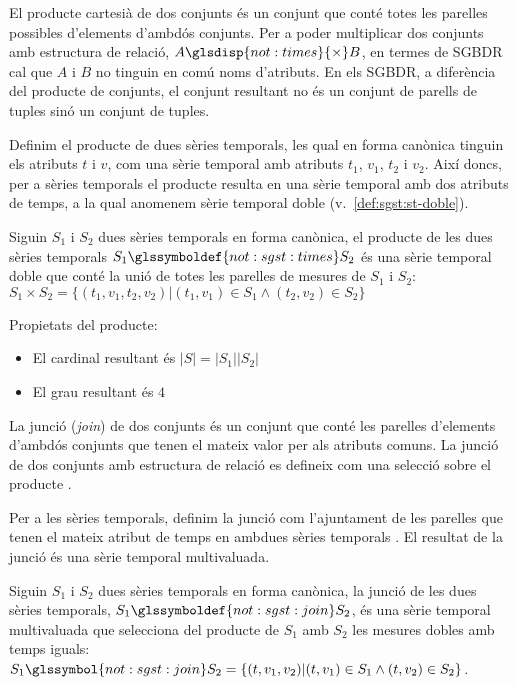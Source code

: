 El producte cartesià de dos conjunts és un conjunt que conté totes les
parelles possibles d'elements d'ambdós conjunts.  Per a poder
multiplicar dos conjunts amb estructura de relació, $A
\glsdisp{not:times}{\times} B$, en termes de \gls{SGBDR} cal que $A$ i
$B$ no tinguin en comú noms d'atributs.  En els \gls{SGBDR}, a
diferència del producte de conjunts, el conjunt resultant no és un
conjunt de parells de tuples sinó un conjunt de tuples.

Definim el producte de dues sèries temporals, les qual en
forma canònica tinguin els atributs $t$ i $v$, com una sèrie temporal
amb atributs $t_1$, $v_1$, $t_2$ i $v_2$. Així doncs, per a sèries
temporals el producte resulta en una sèrie temporal amb dos atributs
de temps, a la qual anomenem sèrie temporal doble (v.\
\autoref{def:sgst:st-doble}).
\begin{definition}[Producte]
  Siguin $S_1$ i $S_2$ dues sèries temporals en forma canònica, el producte de
  les dues sèries temporals $S_1 \glssymboldef{not:sgst:times}
  S_2$ és una sèrie temporal doble que conté
  la unió de totes les parelles de mesures de $S_1$ i $S_2$: $S_1
  \times S_2 = \{ (t_1,v_1,t_2,v_2) | (t_1,v_1) \in S_1 \wedge
  (t_2,v_2) \in S_2 \}$
\end{definition}

Propietats del producte:
\begin{itemize}
\item El cardinal resultant és $|S|=|S_1||S_2|$
\item El grau resultant és $4$
\end{itemize}



La junció (\emph{join}) de dos conjunts és un conjunt que conté les
parelles d'elements d'ambdós conjunts que tenen el mateix valor per
als atributs comuns.  La junció de dos conjunts amb estructura de
relació es defineix com una selecció sobre el
producte \parencite[cap.~7]{date04:introduction8}.


Per a les sèries temporals, definim la junció com l'ajuntament de les
parelles que tenen el mateix atribut de temps en ambdues sèries
temporals . El resultat de la junció és una sèrie temporal
multivaluada.
\begin{definition}[Junció]\label{def:sgst:join}
  Siguin $S_1$ i $S_2$ dues sèries temporals en forma canònica, la junció de
  les dues sèries temporals, $S_1 \glssymboldef{not:sgst:join} S_2$, és
  una sèrie temporal multivaluada que
  selecciona del producte de $S_1$ amb $S_2$ les mesures dobles amb
  temps iguals: $S_1 \glssymbol{not:sgst:join} S_2 = \{ (t,v_1,v_2) |
  (t,v_1) \in S_1 \wedge (t,v_2) \in S_2  \}$.
\end{definition}




